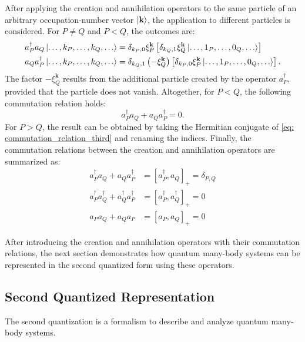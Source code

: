 After applying the creation and annihilation operators to the same particle of an arbitrary occupation-number vector $\ket{\textbf{k}}$, the application to different particles is considered.
For $P \neq Q$ and $P < Q$, the outcomes are:
\begin{align}
    a_P^{\dagger} a_Q \ket{\ldots, k_P, \ldots, k_Q, \ldots} &= \delta_{k_P, 0} \xi_P^{\mathbf{k}} \left [ \delta_{k_Q, 1} \xi_Q^{\mathbf{k}} \ket{\ldots, 1_P, \ldots, 0_Q, \ldots} \right ] \\
    a_Q a_P^{\dagger} \ket{\ldots, k_P, \ldots, k_Q, \ldots} &= \delta_{k_Q, 1} \left (-\xi_Q^{\mathbf{k}} \right ) \left [ \delta_{k_P, 0} \xi_P^{\mathbf{k}} \ket{\ldots, 1_P, \ldots, 0_Q, \ldots} \right ]. \label{eq: commutation_relation_third}
\end{align}
The factor $-\xi_Q^{\mathbf{k}}$ results from the additional particle created by the operator $a_P^{\dagger}$, provided that the particle does not vanish.
Altogether, for $P < Q$, the following commutation relation holds:
\begin{equation}
    a_P^{\dagger} a_Q + a_Q a_P^{\dagger} = 0.
\end{equation}
For $P > Q$, the result can be obtained by taking the Hermitian conjugate of \eqref{eq: commutation_relation_third} and renaming the indices.
Finally, the commutation relations between the creation and annihilation operators are summarized as:
\begin{align}
    a_P^{\dagger} a_Q + a_Q a_P^{\dagger} &= \left [a_P^{\dagger}, a_Q \right ]_+ = \delta_{P, Q} \\
    a_P^{\dagger} a_Q^{\dagger} + a_Q^{\dagger} a_P^{\dagger} &= \left [a_P^{\dagger}, a_Q^{\dagger} \right ]_+ = 0 \\
    a_P a_Q + a_Q a_P &= \left [a_P, a_Q \right ]_+ = 0
\end{align}

After introducing the creation and annihilation operators with their commutation relations, the next section demonstrates how quantum many-body systems can be represented in the second quantized form using these operators.

\subsection{Second Quantized Representation}




The second quantization is a formalism to describe and analyze quantum many-body systems. \cite{Altland}
